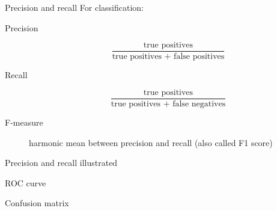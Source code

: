\begin{frame}{Precision and recall}
  For classification:
  \begin{description}
  \item[Precision]
    \[
    \frac{\text{true positives}}{\text{true positives + false positives}}
    \]
  \item[Recall]
    \[
    \frac{\text{true positives}}{\text{true positives + false negatives}}
  \]
  \item[F-measure] harmonic mean between precision and recall (also called F1 score)
  \end{description}
\end{frame}

\begin{frame}{Precision and recall illustrated}
\end{frame}

\begin{frame}{ROC curve}
\end{frame}

\begin{frame}{Confusion matrix}
\end{frame}

